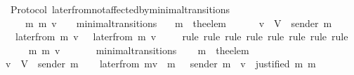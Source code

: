 \begin{isabellebody}
\isanewline
\isanewline
\isanewline
\isanewline
\isanewline
{}\isamarkupfalse%
\ {\isacharparenleft}\ Protocol{\isacharparenright}\ later{\isacharunderscore}from{\isacharunderscore}not{\isacharunderscore}affected{\isacharunderscore}by{\isacharunderscore}minimal{\isacharunderscore}transitions\ {\isacharcolon}\isanewline
\ \ {\isachardoublequoteopen}{\isasymforall}\ {\isasymsigma}\ {\isasymsigma}{\isacharprime}\ m\ m{\isacharprime}\ v{\isachardot}\ {\isacharparenleft}{\isasymsigma}{\isacharcomma}\ {\isasymsigma}{\isacharprime}{\isacharparenright}\ {\isasymin}\ minimal{\isacharunderscore}transitions\isanewline
\ \ {\isasymlongrightarrow}\ m{\isacharprime}\ {\isacharequal}\ the{\isacharunderscore}elem\ {\isacharparenleft}{\isasymsigma}{\isacharprime}\ {\isacharminus}\ {\isasymsigma}{\isacharparenright}\isanewline
\ \ {\isasymlongrightarrow}\ v\ {\isasymin}\ V\ {\isacharminus}\ {\isacharbraceleft}sender\ m{\isacharprime}{\isacharbraceright}\isanewline
\ \ {\isasymlongrightarrow}\ later{\isacharunderscore}from\ {\isacharparenleft}m{\isacharcomma}\ v{\isacharcomma}\ {\isasymsigma}{\isacharparenright}\ {\isacharequal}\ later{\isacharunderscore}from\ {\isacharparenleft}m{\isacharcomma}\ v{\isacharcomma}\ {\isasymsigma}{\isacharprime}{\isacharparenright}{\isachardoublequoteclose}\isanewline
%
\isadelimproof
\ \ %
\endisadelimproof
%
\isatagproof
{}\isamarkupfalse%
\ {\isacharparenleft}rule{\isacharcomma}\ rule{\isacharcomma}\ rule{\isacharcomma}\ rule{\isacharcomma}\ rule{\isacharcomma}\ rule{\isacharcomma}\ rule{\isacharcomma}\ rule{\isacharparenright}\isanewline
{}\isamarkupfalse%
{\isacharminus}\isanewline
\ \ \isamarkupfalse%
\ {\isasymsigma}\ {\isasymsigma}{\isacharprime}\ m\ m{\isacharprime}\ v\isanewline
\ \ \isamarkupfalse%
\ {\isachardoublequoteopen}{\isacharparenleft}{\isasymsigma}{\isacharcomma}\ {\isasymsigma}{\isacharprime}{\isacharparenright}\ {\isasymin}\ minimal{\isacharunderscore}transitions{\isachardoublequoteclose}\isanewline
\ \ \isamarkupfalse%
\ {\isachardoublequoteopen}m{\isacharprime}\ {\isacharequal}\ the{\isacharunderscore}elem\ {\isacharparenleft}{\isasymsigma}{\isacharprime}\ {\isacharminus}\ {\isasymsigma}{\isacharparenright}{\isachardoublequoteclose}\isanewline
\ \ \isamarkupfalse%
\ {\isachardoublequoteopen}v\ {\isasymin}\ V\ {\isacharminus}\ {\isacharbraceleft}sender\ m{\isacharprime}{\isacharbraceright}{\isachardoublequoteclose}\isanewline
\isanewline
\ \ \isamarkupfalse%
\ {\isachardoublequoteopen}later{\isacharunderscore}from\ {\isacharparenleft}m{\isacharcomma}v{\isacharcomma}{\isasymsigma}{\isacharparenright}\ {\isacharequal}\ {\isacharbraceleft}m{\isacharprime}{\isacharprime}\ {\isasymin}\ {\isasymsigma}{\isachardot}\ sender\ m{\isacharprime}{\isacharprime}\ {\isacharequal}\ v\ {\isasymand}\ justified\ m\ m{\isacharprime}{\isacharprime}{\isacharbraceright}{\isachardoublequoteclose}\isanewline

\end{isabellebody}
